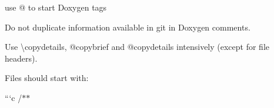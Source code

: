 \begin{DoxyItemize}
\item use {\ttfamily @} to start Doxygen tags
\item Do not duplicate information available in git in Doxygen comments.
\item Use {\ttfamily \textbackslash{}copydetails}, {\ttfamily @copybrief} and {\ttfamily @copydetails} intensively (except for file headers).
\end{DoxyItemize}

Files should start with\+:

```c /$\ast$$\ast$
\begin{DoxyItemize}
\item 
\end{DoxyItemize}
